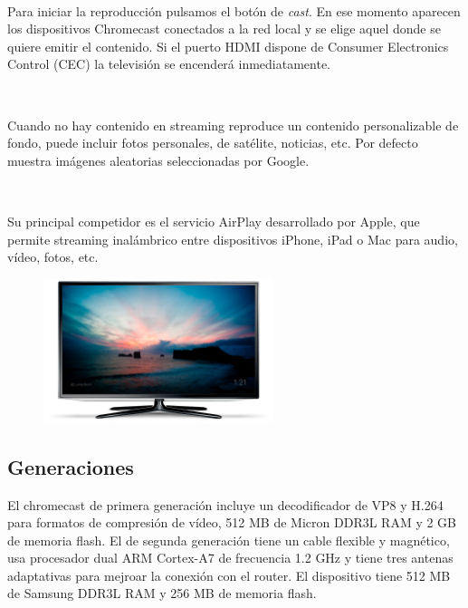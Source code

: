 \

Para iniciar la reproducción pulsamos el botón de \textit{cast}. En ese momento aparecen los dispositivos Chromecast conectados a la red local y se elige aquel donde se quiere emitir el contenido. Si el puerto HDMI dispone de Consumer Electronics Control (CEC) la televisión se encenderá inmediatamente.

\

Cuando no hay contenido en streaming reproduce un contenido personalizable de fondo, puede incluir fotos personales,
de satélite, noticias, etc. Por defecto muestra imágenes aleatorias seleccionadas por Google.

\

Su principal competidor es el servicio AirPlay desarrollado por Apple, que permite streaming inalámbrico entre dispositivos iPhone, iPad o Mac para audio, vídeo, fotos, etc.

\vspace{1cm}
\begin{figure}[h]
	\centering
	\includegraphics[width=0.6\textwidth]{./Imagenes/fondo.png}
	\label{fig:fondo}
\end{figure}

\newpage


\subsection{Generaciones}

El chromecast de primera generación incluye un decodificador de VP8 y H.264 para formatos de compresión de vídeo, 512 MB de Micron DDR3L RAM y 2 GB de memoria flash.
El de segunda generación tiene un cable flexible y magnético, usa procesador dual ARM Cortex-A7 de frecuencia 1.2 GHz y tiene tres antenas adaptativas para mejroar la conexión con el router.
El dispositivo tiene 512 MB de Samsung DDR3L RAM y 256 MB de memoria flash.
